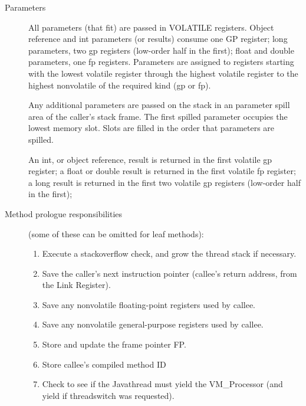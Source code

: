 \begin{description}
\item[Parameters]

    All parameters (that fit) are passed in VOLATILE registers.  Object
    reference and int parameters (or results) consume one GP register; long
    parameters, two gp registers (low-order half in the first);  float and
    double parameters, one fp registers.  Parameters are 
    assigned to registers
    starting with the lowest volatile register through the highest volatile
    register to the highest nonvolatile of the required kind (gp or fp).

    Any additional parameters are passed on the stack in an parameter spill
    area of the caller's stack frame.  The first spilled parameter occupies
    the lowest memory slot.  Slots are filled in the order that parameters
    are spilled.

    An int, or object reference, result is returned in the first volatile
    gp register; a float or double result is returned in the first volatile
    fp register; a long result is returned in the first two volatile gp
    registers (low-order half in the first);

\item [Method prologue responsibilities] (some of these can be omitted for leaf
  methods):

\begin{enumerate}
\item Execute a stackoverflow check, and grow the thread stack if necessary.

\item Save the caller's next instruction pointer (callee's return address,
       from the Link Register).

\item Save any nonvolatile floating-point registers used by callee.

\item Save any nonvolatile general-purpose registers used by callee.

\item Store and update the frame pointer FP.

\item Store callee's compiled method ID 

\item Check to see if the Java\trademark thread must yield the VM\_Processor
(and yield if threadswitch was requested). 
\end{enumerate}


\end{description}
